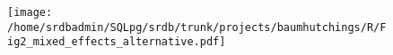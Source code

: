 \documentclass[letterpaper,12pt]{article}
\begin{document}


\begin{figure}
\begin{center}
\texttt{[image: /home/srdbadmin/SQLpg/srdb/trunk/projects/baumhutchings/R/Fig2\_mixed\_effects\_alternative.pdf]}
\end{center}
\caption{}
\end{figure}\label{fig2}
\end{document}
